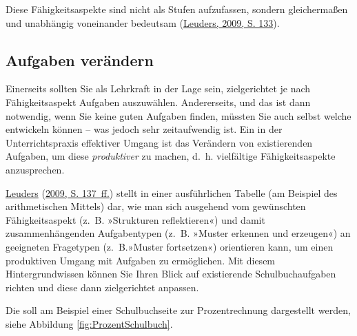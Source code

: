 \documentclass[
  ngerman,
]{scrbook}
\theoremstyle{definition}
\theoremstyle{definition}
\theoremstyle{definition}
\theoremstyle{definition}
\theoremstyle{remark}
\begin{document}
Diese Fähigkeitsaspekte sind nicht als Stufen aufzufassen, sondern gleichermaßen und unabhängig voneinander bedeutsam (\protect\hyperlink{ref-Leuders2009}{Leuders, 2009, S. 133}).

\hypertarget{aufgaben-veruxe4ndern}{%
\subsection{Aufgaben verändern}\label{aufgaben-veruxe4ndern}}

Einerseits sollten Sie als Lehrkraft in der Lage sein, zielgerichtet je nach Fähigkeitsaspekt Aufgaben auszuwählen. Andererseits, und das ist dann notwendig, wenn Sie keine guten Aufgaben finden, müssten Sie auch selbst welche entwickeln können -- was jedoch sehr zeitaufwendig ist. Ein in der Unterrichtspraxis effektiver Umgang ist das Verändern von existierenden Aufgaben, um diese \emph{produktiver} zu machen, d.~h. vielfältige Fähigkeitsaspekte anzusprechen.

\protect\hyperlink{ref-Leuders2009}{Leuders} (\protect\hyperlink{ref-Leuders2009}{2009, S. 137~ff.}) stellt in einer ausführlichen Tabelle (am Beispiel des arithmetischen Mittels) dar, wie man sich ausgehend vom gewünschten Fähigkeitsaspekt (z.~B. »Strukturen reflektieren«) und damit zusammenhängenden Aufgabentypen (z.~B. »Muster erkennen und erzeugen«) an geeigneten Fragetypen (z.~B.»Muster fortsetzen«) orientieren kann, um einen produktiven Umgang mit Aufgaben zu ermöglichen. Mit diesem Hintergrundwissen können Sie Ihren Blick auf existierende Schulbuchaufgaben richten und diese dann zielgerichtet anpassen.

Die soll am Beispiel einer Schulbuchseite zur Prozentrechnung dargestellt werden, siehe Abbildung \ref{fig:ProzentSchulbuch}.
\end{document}
